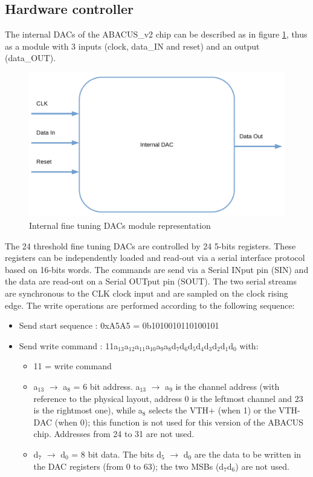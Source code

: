 \subsection{Hardware controller}\label{InternalDac}
\noindent The internal DACs of the ABACUS\_v2 chip can be described as in figure \ref{fig:internaldac}, thus as a module with 3 inputs (clock, data\_IN and reset) and an output (data\_OUT)\cite{dac}.
\begin{figure}[H]
	\centering
	\includegraphics[width=0.4\linewidth]{IMG/ch4/INTERNALDAC}
	\caption{Internal fine tuning DACs module representation}
	\label{fig:internaldac}
\end{figure}
\noindent The 24 threshold fine tuning DACs are controlled by 24 5-bits registers. These registers can be independently
loaded and read-out via a serial interface protocol based on 16-bits words. The commands are send via a Serial
INput pin (SIN) and the data are read-out on a Serial OUTput pin (SOUT). The two serial streams are
synchronous to the CLK clock input and are sampled on the clock rising edge.
\newline
The write operations are performed according to the following sequence:
\begin{itemize}
	\item Send start sequence : 0xA5A5 = 0b1010010110100101
	\item Send write command : 11a$_{13}$a$_{12}$a$_{11}$a$_{10}$a$_{9}$a$_{8}$d$_{7}$d$_{6}$d$_{5}$d$_{4}$d$_{3}$d$_{2}$d$_{1}$d$_{0}$ with:
	\begin{itemize}
		\item 11 = write command
		\item a$_{13}$ $\rightarrow$ a$_{8}$ = 6 bit address. a$_{13}$ $\rightarrow$ a$_{9}$ is the channel address (with reference to the physical layout, address 0 is the leftmost channel and 23 is the rightmost one), while a$_{8}$ selects the VTH+ (when 1) or the VTH- DAC (when 0); this function is not used for this version of the ABACUS chip. Addresses from
		24 to 31 are not used.
		\item d$_{7}$ $\rightarrow$ d$_{0}$ = 8 bit data. The bits d$_{5}$ $\rightarrow$ d$_{0}$ are the data to be written in the DAC registers (from 0 to 63); the two MSBs (d$_{7}$d$_{6}$) are not used.
	\end{itemize}
\end{itemize}
